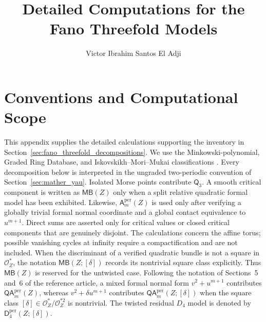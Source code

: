 \documentclass[11pt]{amsart}
\newcommand{\MorseCat}[1]{\mathsf{Q}_{#1}}
\newcommand{\MBcat}[1]{\mathsf{MB}(#1)}
\newcommand{\MBtwcat}[2]{\mathsf{MB}(#1;[#2])}
\newcommand{\Aper}[2]{\mathsf{A}^{\mathrm{per}}_{#2}(#1)}
\newcommand{\QAper}[2]{\mathsf{QA}^{\mathrm{per}}_{#2}(#1)}
\newcommand{\QAtwist}[3]{\mathsf{QA}^{\mathrm{per}}_{#2}(#1;[#3])}
\newcommand{\Dfourcat}[2]{\mathsf{D}^{\mathrm{per}}_{4}(#1;[#2])}
\begin{document}
\title{Detailed Computations for the Fano Threefold Models}
\author{Victor Ibrahim Santos El Adji}
\date{}
\maketitle

\section{Conventions and Computational Scope}
\label{sec:fano_threefold_appendix}
This appendix supplies the detailed calculations supporting the inventory in
Section~\ref{sec:fano_threefold_decompositions}. We use the
Minkowski-polynomial, Graded Ring Database, and Iskovskikh--Mori--Mukai
classifications
\cite{akhtar2012minkowski,Coates_2019,Fano3,Iskovskikh1977FanoI,Iskovskikh1978FanoII,MoriMukai1981FanoB2,MoriMukai1983FanoB2,MoriMukai2003Erratum}.
Every decomposition below is interpreted in the ungraded two-periodic
convention of Section~\ref{sec:mather_yau}. Isolated Morse points contribute
$\MorseCat{3}$. A smooth critical component is written as $\MBcat{Z}$ only
when a split relative quadratic formal model has been exhibited. Likewise,
$\Aper{Z}{m}$ is used only after verifying a globally trivial formal normal
coordinate and a global contact equivalence to $u^{m+1}$. Direct sums are
asserted only for critical values or closed critical components that are
genuinely disjoint. The calculations concern the affine torus; possible
vanishing cycles at infinity require a compactification and are not included.
When the discriminant of a verified quadratic bundle is not a square in
$\mathcal O_Z^*$, the notation $\MBtwcat{Z}{\delta}$ records its nontrivial
square class explicitly. Thus $\MBcat{Z}$ is reserved for the untwisted case.
Following the notation of Sections~5 and~6 of the reference article, a mixed
formal normal form $v^2+u^{m+1}$ contributes $\QAper{Z}{m}$, whereas
$v^2+\delta u^{m+1}$ contributes $\QAtwist{Z}{m}{\delta}$ when the square
class $[\delta]\in\mathcal O_Z^*/\mathcal O_Z^{*2}$ is nontrivial. The
twisted residual $D_4$ model is denoted by $\Dfourcat{Z}{\delta}$.
\end{document}
